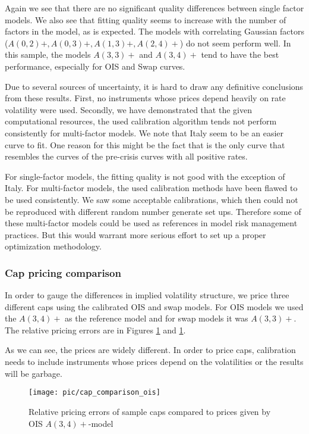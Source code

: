 Again we see that there are no significant quality differences between single factor models. We also see that fitting quality seems to increase with the number of factors in the model, as is expected. The models with correlating Gaussian factors ($A(0,2)+, A(0,3)+, A(1,3)+, A(2,4)+$) do not seem perform well. In this sample, the models $A(3,3)+$ and $A(3,4)+$ tend to have the best performance, especially for OIS and Swap curves.

Due to several sources of uncertainty, it is hard to draw any definitive conclusions from these results. First, no instruments whose prices depend heavily on rate volatility were used. Secondly, we have demonstrated that the given computational resources, the used calibration algorithm tends not perform consistently for multi-factor models. We note that Italy seem to be an easier curve to fit. One reason for this might be the fact that is the only curve that resembles the curves of the pre-crisis curves with all positive rates.

For single-factor models, the fitting quality is not good with the exception of Italy. For multi-factor models, the used calibration methods have been flawed to be used consistently. We saw some acceptable calibrations, which then could not be reproduced with different random number generate set ups. Therefore some of these multi-factor models could be used as references in model risk management practices. But this would warrant more serious effort to set up a proper optimization methodology.

\subsubsection{Cap pricing comparison}

In order to gauge the differences in implied volatility structure, we price three different caps using the calibrated OIS and swap models. For OIS models we used the $A(3,4)+$ as the reference model and for swap models it was $A(3,3)+$. The relative pricing errors are in Figures \ref{fig:cap_comparison_ois} and \ref{fig:cap_comparison_ois}.

As we can see, the prices are widely different. In order to price caps, calibration needs to include instruments whose prices depend on the volatilities or the results will be garbage.

\begin{figure}[H]
	\centering
	\texttt{[image: pic/cap\_comparison\_ois]}
	\caption{Relative pricing errors of sample caps compared to prices given by OIS $A(3,4)+$-model}
	\label{fig:cap_comparison_ois}
\end{figure} 

